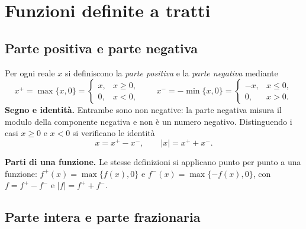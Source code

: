 \section{Funzioni definite a tratti}

\subsection{Parte positiva e parte negativa}

Per ogni reale $x$ si definiscono la \emph{parte positiva} e la \emph{parte negativa} mediante
\[
x^+=\max\{x,0\}=\begin{cases}x,&x\ge0,\\0,&x<0,\end{cases}
\qquad
x^-=-\min\{x,0\}=\begin{cases}-x,&x\le0,\\0,&x>0.\end{cases}
\]
\textbf{Segno e identità.} Entrambe sono non negative: la parte negativa misura il modulo della componente negativa e non è un numero negativo. Distinguendo i casi $x\ge0$ e $x<0$ si verificano le identità
\[
\boxed{x=x^+-x^-,\qquad |x|=x^++x^-}.
\]


\textbf{Parti di una funzione.} Le stesse definizioni si applicano punto per punto a una funzione: $f^+(x)=\max\{f(x),0\}$ e $f^-(x)=\max\{-f(x),0\}$, con $f=f^+-f^-$ e $|f|=f^++f^-$.

\begin{schema}
\hspace{1cm}
\end{schema}

\subsection{Parte intera e parte frazionaria}
\enlargethispage{2pt}

